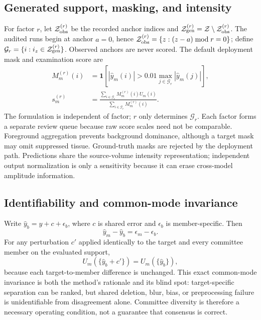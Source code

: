 \documentclass{article}
\begin{document}
\subsection{Generated support, masking, and intensity}
For factor $r$, let $\mathcal Z_{\rm obs}^{(r)}$ be the recorded anchor indices and $\mathcal Z_{\rm gen}^{(r)}=\mathcal Z\setminus\mathcal Z_{\rm obs}^{(r)}$. The audited runs begin at anchor $a=0$, hence $\mathcal Z_{\rm obs}^{(r)}=\{z:(z-a)\bmod r=0\}$; define $\mathcal G_r=\{i:i_z\in\mathcal Z_{\rm gen}^{(r)}\}$. Observed anchors are never scored. The default deployment mask and examination score are
\begin{align}
 M_m^{(r)}(i)&=\mathbf1\!\left[|\hat y_m(i)|>0.01\max_{j\in\mathcal G_r}|\hat y_m(j)|\right],\label{eq:mask}\\
 s_m^{(r)}&=\frac{\sum_{i\in\mathcal G_r}M_m^{(r)}(i)U_m(i)}{\sum_{i\in\mathcal G_r}M_m^{(r)}(i)}.
 \label{eq:case}
\end{align}
The formulation is independent of factor; $r$ only determines $\mathcal G_r$. Each factor forms a separate review queue because raw score scales need not be comparable. Foreground aggregation prevents background dominance, although a target mask may omit suppressed tissue. Ground-truth masks are rejected by the deployment path. Predictions share the source-volume intensity representation; independent output normalization is only a sensitivity because it can erase cross-model amplitude information.

\subsection{Identifiability and common-mode invariance}
Write $\hat y_b=y+c+\epsilon_b$, where $c$ is shared error and $\epsilon_b$ is member-specific. Then
\begin{equation}
 \hat y_m-\hat y_b=\epsilon_m-\epsilon_b.
 \label{eq:decomp}
\end{equation}
For any perturbation $c'$ applied identically to the target and every committee member on the evaluated support,
\begin{equation}
 U_m(\{\hat y_b+c'\})=U_m(\{\hat y_b\}),
 \label{eq:invariance}
\end{equation}
because each target-to-member difference is unchanged. This exact common-mode invariance is both the method's rationale and its blind spot: target-specific separation can be ranked, but shared deletion, blur, bias, or preprocessing failure is unidentifiable from disagreement alone. Committee diversity is therefore a necessary operating condition, not a guarantee that consensus is correct.
\end{document}
